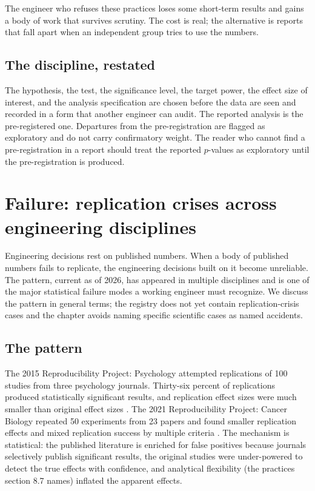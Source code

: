 The engineer who refuses these practices loses some short-term
results and gains a body of work that survives scrutiny. The cost
is real; the alternative is reports that fall apart when an
independent group tries to use the numbers.

\subsection{The discipline, restated}

\begin{principle}
The hypothesis, the test, the significance level, the target power,
the effect size of interest, and the analysis specification are
chosen before the data are seen and recorded in a form that another
engineer can audit. The reported analysis is the pre-registered one.
Departures from the pre-registration are flagged as exploratory and
do not carry confirmatory weight. The reader who cannot find a
pre-registration in a report should treat the reported $p$-values
as exploratory until the pre-registration is produced.
\end{principle}

\section{Failure: replication crises across engineering disciplines}

Engineering decisions rest on published numbers. When a body of
published numbers fails to replicate, the engineering decisions
built on it become unreliable. The pattern, current as of 2026, has
appeared in multiple disciplines and is one of the major statistical
failure modes a working engineer must recognize. We discuss the
pattern in general terms; the registry does not yet contain
replication-crisis cases and the chapter avoids naming specific
scientific cases as named accidents.

\subsection{The pattern}

The 2015 Reproducibility Project: Psychology attempted replications
of 100 studies from three psychology journals. Thirty-six percent
of replications produced statistically significant results, and
replication effect sizes were much smaller than original effect
sizes \cite{method:open-science-collaboration-2015}. The 2021
Reproducibility Project: Cancer Biology repeated 50 experiments
from 23 papers and found smaller replication effects and mixed
replication success by multiple criteria
\cite{method:errington-cancer-biology-2021}.
The mechanism is statistical: the published literature is enriched
for false positives because journals selectively publish significant
results, the original studies were under-powered to detect the
true effects with confidence, and analytical flexibility (the
practices section 8.7 names) inflated the apparent effects.


